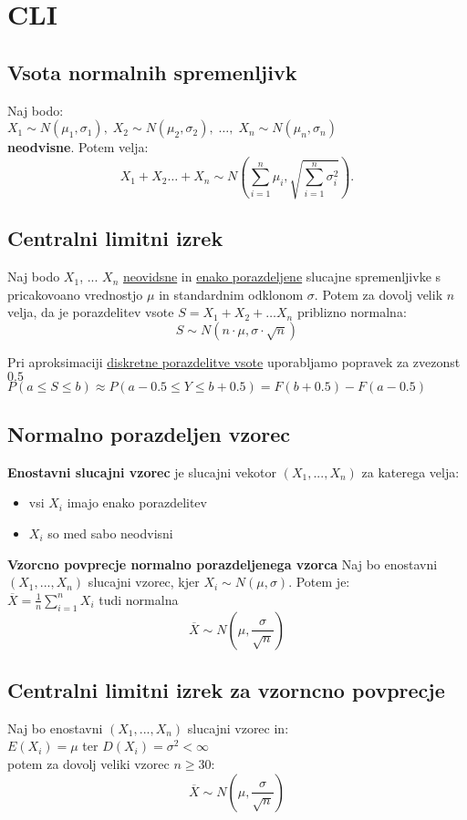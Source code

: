 \section{CLI}

\subsection{Vsota normalnih spremenljivk}
Naj bodo:\\
$X_1\sim N(\mu_1,\sigma_1),\; X_2\sim N(\mu_2,\sigma_2),\; \ldots,\; X_n\sim N(\mu_n,\sigma_n)$\\
\textbf{neodvisne}. Potem velja:\\
$$X_1+X_2\ldots + X_n\sim N\left( \sum_{i=1}^n \mu_i, \sqrt{\sum_{i=1}^n \sigma_i^2}\right).$$

\subsection{Centralni limitni izrek}
Naj bodo $X_1$, ... $X_n$ \underline{neovidsne} in \underline{enako porazdeljene} slucajne spremenljivke s pricakovoano vrednostjo $\mu$ in standardnim odklonom $\sigma$.
Potem za dovolj velik $n$ velja, da je porazdelitev vsote $S=X_1+X_2+\dots X_n$ priblizno normalna:\\
$$S\sim N(n\cdot \mu, \sigma \cdot \sqrt{n})$$

Pri aproksimaciji \underline{diskretne porazdelitve vsote} uporabljamo popravek za zvezonst $0.5$\\
$P(a\leq S\leq b)\approx P(a-0.5\leq Y\leq b+0.5)=F(b+0.5)-F(a-0.5)$\\

\subsection{Normalno porazdeljen vzorec}
\textbf{Enostavni slucajni vzorec} je slucajni vekotor $(X_1,...,X_n)$ za katerega velja:
\begin{itemize}[leftmargin=*]
    \item vsi $X_i$ imajo enako porazdelitev
    \item $X_i$ so med sabo neodvisni
\end{itemize}
\textbf{Vzorcno povprecje normalno porazdeljenega vzorca}
Naj bo enostavni $(X_1,...,X_n)$ slucajni vzorec, kjer $X_i\sim N(\mu, \sigma)$. Potem je:\\
$\overline{X}=\frac{1}{n}\sum\limits^n_{i=1} X_i$ tudi normalna\\
$$\overline{X}\sim N(\mu, \frac{\sigma}{\sqrt{n}})$$


\subsection{Centralni limitni izrek za vzorncno povprecje}
Naj bo enostavni $(X_1,...,X_n)$ slucajni vzorec in:\\
$E(X_i)=\mu$ ter  $D(X_i)=\sigma^2 < \infty$\\
potem za dovolj veliki vzorec $n \ge 30$:\\
$$\overline{X}\sim N (\mu, \frac{\sigma}{\sqrt{n}})$$
